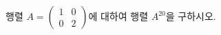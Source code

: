 \hspace*{2mm}\begin{minipage}[t]{\dimexpr\linewidth-2mm\relax}\vspace{0pt}
행렬 $A=\begin{pmatrix} 1 & 0 \\ 0 & 2 \end{pmatrix}$에 대하여 행렬 $A^{20}$을 구하시오.\end{minipage}
